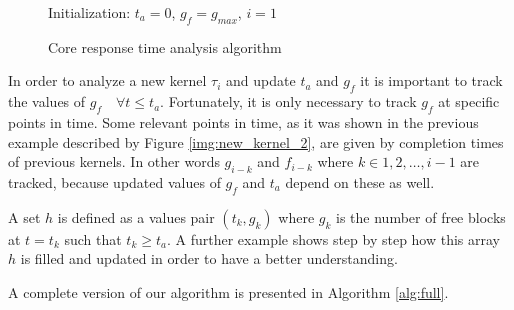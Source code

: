 \documentclass[
  12pt,
  a4paperpaper,
]{report}
\begin{document}
\begin{figure}[ht]
\centering
\begin{minipage}{.7\linewidth}
    \begin{algorithm}[H]
        \DontPrintSemicolon
        \SetAlgoLined
        \Input{$\tau$}
        \BlankLine
        Initialization: $t_a = 0$, $g_f = g_{max}$, $i=1$ \\
        \caption{Core response time analysis algorithm }
        \label{alg:basic}
    \end{algorithm} 
  \end{minipage}
\end{figure}

In order to analyze a new kernel \(\tau_i\) and update \(t_a\) and
\(g_f\) it is important to track the values of \(g_f\quad \forall t \leq t_a\).
Fortunately, it is only necessary to track \(g_f\) at specific points in
time. Some relevant points in time, as it was shown in the previous
example described by Figure \ref{img:new_kernel_2}, are given by
completion times of previous kernels. In other words 
\(g_{i-k}\) and \(f_{i-k}\) where \(k \in {1,2,\dots, i-1}\) are tracked, because
updated values of \(g_f\) and \(t_a\) depend on these as well.

A set \(h\) is defined as a values  pair \((t_k, g_k)\) where \(g_k\)
is the number of free blocks at \(t=t_k\) such that \(t_k \geq t_a\).
A further example shows step by step how this array \(h\) is
filled and updated in order to have a better understanding.

A complete version of our algorithm is presented in Algorithm
\ref{alg:full}.
\end{document}
